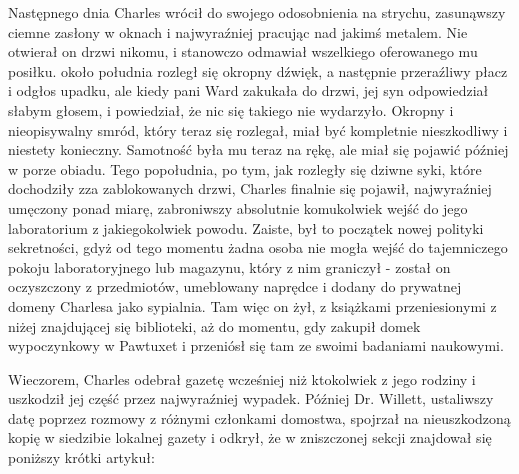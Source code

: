 Następnego dnia Charles wrócił do swojego odosobnienia na strychu,  zasunąwszy ciemne zasłony w oknach i najwyraźniej pracując nad jakimś metalem. Nie otwierał on drzwi nikomu, i stanowczo odmawiał wszelkiego oferowanego mu posiłku. około południa rozległ się okropny dźwięk, a następnie przeraźliwy płacz i odgłos upadku, ale kiedy pani Ward zakukała do drzwi, jej syn odpowiedział słabym głosem, i powiedział, że nic się takiego nie wydarzyło. Okropny i nieopisywalny smród, który teraz się rozlegał, miał być kompletnie nieszkodliwy i niestety konieczny. Samotność była mu teraz na rękę, ale miał się pojawić później w porze obiadu. Tego popołudnia, po tym, jak rozległy się dziwne syki, które dochodziły zza zablokowanych drzwi, Charles finalnie się pojawił, najwyraźniej umęczony ponad miarę, zabroniwszy absolutnie komukolwiek wejść do jego laboratorium z jakiegokolwiek powodu. Zaiste, był to początek nowej polityki sekretności, gdyż od tego momentu żadna osoba nie mogła wejść do tajemniczego pokoju laboratoryjnego lub magazynu, który z nim graniczył - został on oczyszczony z przedmiotów, umeblowany naprędce i dodany do prywatnej domeny Charlesa jako sypialnia. Tam więc on żył, z książkami przeniesionymi z niżej znajdującej się biblioteki, aż do momentu, gdy zakupił domek wypoczynkowy w Pawtuxet i przeniósł się tam ze swoimi badaniami naukowymi. 

Wieczorem, Charles odebrał gazetę wcześniej niż ktokolwiek z jego rodziny i uszkodził jej część przez najwyraźniej wypadek. Później Dr. Willett, ustaliwszy datę poprzez rozmowy z różnymi członkami domostwa, spojrzał na nieuszkodzoną kopię w siedzibie lokalnej gazety i odkrył, że w zniszczonej sekcji znajdował się poniższy krótki artykuł:

